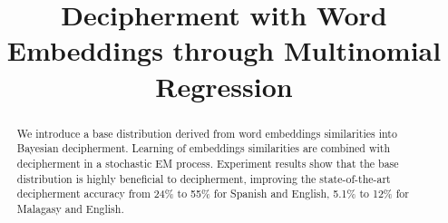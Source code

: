 \documentclass[11pt]{article}
\title{Decipherment with Word Embeddings through Multinomial Regression}
\date{}
\begin{document}
\maketitle
\begin{abstract}
We introduce a base distribution derived from word embeddings similarities into Bayesian decipherment. Learning of embeddings similarities are combined with decipherment in a stochastic EM process. Experiment results show that the base distribution is highly beneficial to decipherment, improving the state-of-the-art decipherment accuracy from 24\% to 55\% for Spanish and English, 5.1\% to 12\% for Malagasy and English. 
\end{abstract}













\end{document}
